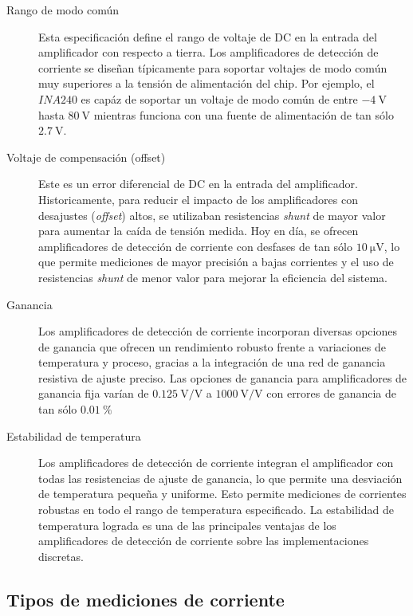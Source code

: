 \documentclass[
10pt, %
a4paper, %
oneside, %
headinclude,footinclude, %
BCOR5mm, %
]{scrartcl}
\begin{document}
\begin{description}
	\item[Rango de modo común] Esta especificación define el rango de voltaje de DC en la entrada del amplificador con respecto a tierra. Los amplificadores de detección de corriente se diseñan típicamente para soportar voltajes de modo común muy superiores a la tensión de alimentación del chip. Por ejemplo, el $INA240$ es capáz de soportar un voltaje de modo común de entre $\qty{-4}{\volt}$ hasta $\qty{+80}{\volt}$ mientras funciona con una fuente de alimentación de tan sólo $\qty{2.7}{\volt}$.
	
	\item[Voltaje de compensación (offset)] Este es un error diferencial de DC en la entrada del amplificador. Historicamente, para reducir el impacto de los amplificadores con desajustes (\textit{offset}) altos, se utilizaban resistencias \textit{shunt} de mayor valor para aumentar la caída de tensión medida. Hoy en día, se ofrecen amplificadores de detección de corriente con desfases de tan sólo $\qty{10}{\micro \volt}$, lo que permite mediciones de mayor precisión a bajas corrientes y el uso de resistencias \textit{shunt} de menor valor para mejorar la eficiencia del sistema.
	
	\item[Ganancia] Los amplificadores de detección de corriente incorporan diversas opciones de ganancia que ofrecen un rendimiento robusto frente a variaciones de temperatura y proceso, gracias a la integración de una red de ganancia resistiva de ajuste preciso. Las opciones de ganancia para amplificadores de ganancia fija varían de $\qty{0.125}{\volt/\volt}$ a $\qty{1000}{\volt/\volt}$ con errores de ganancia de tan sólo $\qty{0.01}{\percent}$
	
	\item[Estabilidad de temperatura] Los amplificadores de detección de corriente integran el amplificador con todas las resistencias de ajuste de ganancia, lo que permite una desviación de temperatura pequeña y uniforme. Esto permite mediciones de corrientes robustas en todo el rango de temperatura especificado. La estabilidad de temperatura lograda es una de las principales ventajas de los amplificadores de detección de corriente sobre las implementaciones discretas.
\end{description}

\subsection{Tipos de mediciones de corriente}
\end{document}
